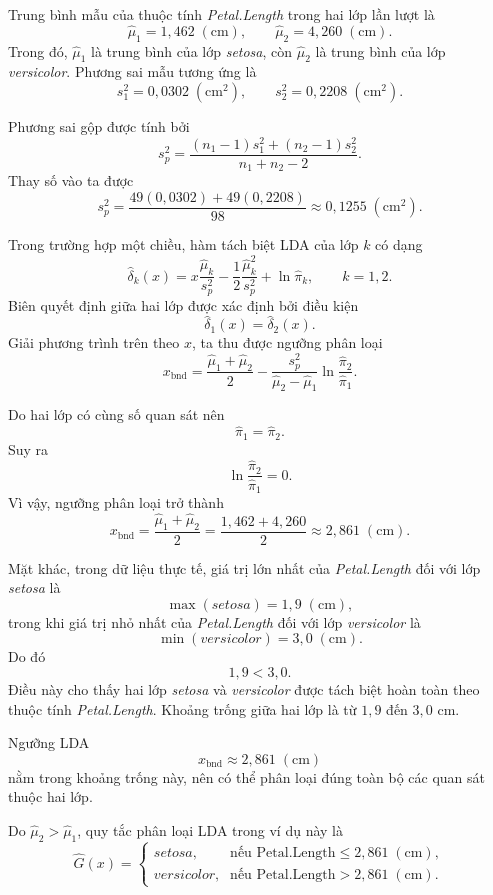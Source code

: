 Trung bình mẫu của thuộc tính \textit{Petal.Length} trong hai lớp lần lượt là
\[
\hat{\mu}_1=1{,}462\;(\text{cm}), 
\qquad 
\hat{\mu}_2=4{,}260\;(\text{cm}).
\]
Trong đó, $\hat{\mu}_1$ là trung bình của lớp \textit{setosa}, còn $\hat{\mu}_2$ là trung bình của lớp \textit{versicolor}. Phương sai mẫu tương ứng là
\[
s_1^2=0{,}0302\;(\text{cm}^2), 
\qquad 
s_2^2=0{,}2208\;(\text{cm}^2).
\]

Phương sai gộp được tính bởi
\[
s_p^2
=
\frac{(n_1-1)s_1^2+(n_2-1)s_2^2}{n_1+n_2-2}.
\]
Thay số vào ta được
\[
s_p^2
=
\frac{49(0{,}0302)+49(0{,}2208)}{98}
\approx
0{,}1255\;(\text{cm}^2).
\]

Trong trường hợp một chiều, hàm tách biệt LDA của lớp $k$ có dạng
\[
\hat{\delta}_k(x)
=
x\frac{\hat{\mu}_k}{s_p^2}
-
\frac{1}{2}\frac{\hat{\mu}_k^2}{s_p^2}
+
\ln\hat{\pi}_k,
\qquad k=1,2.
\]
Biên quyết định giữa hai lớp được xác định bởi điều kiện
\[
\hat{\delta}_1(x)=\hat{\delta}_2(x).
\]
Giải phương trình trên theo $x$, ta thu được ngưỡng phân loại
\[
x_{\text{bnd}}
=
\frac{\hat{\mu}_1+\hat{\mu}_2}{2}
-
\frac{s_p^2}{\hat{\mu}_2-\hat{\mu}_1}
\ln\frac{\hat{\pi}_2}{\hat{\pi}_1}.
\]

Do hai lớp có cùng số quan sát nên
\[
\hat{\pi}_1=\hat{\pi}_2.
\]
Suy ra
\[
\ln\frac{\hat{\pi}_2}{\hat{\pi}_1}=0.
\]
Vì vậy, ngưỡng phân loại trở thành
\[
x_{\text{bnd}}
=
\frac{\hat{\mu}_1+\hat{\mu}_2}{2}
=
\frac{1{,}462+4{,}260}{2}
\approx
2{,}861\;(\text{cm}).
\]

Mặt khác, trong dữ liệu thực tế, giá trị lớn nhất của \textit{Petal.Length} đối với lớp \textit{setosa} là
\[
\max(\textit{setosa})=1{,}9\;(\text{cm}),
\]
trong khi giá trị nhỏ nhất của \textit{Petal.Length} đối với lớp \textit{versicolor} là
\[
\min(\textit{versicolor})=3{,}0\;(\text{cm}).
\]
Do đó
\[
1{,}9 < 3{,}0.
\]
Điều này cho thấy hai lớp \textit{setosa} và \textit{versicolor} được tách biệt hoàn toàn theo thuộc tính \textit{Petal.Length}. Khoảng trống giữa hai lớp là từ $1{,}9$ đến $3{,}0$ cm.

Ngưỡng LDA
\[
x_{\text{bnd}}\approx 2{,}861\;(\text{cm})
\]
nằm trong khoảng trống này, nên có thể phân loại đúng toàn bộ các quan sát thuộc hai lớp.

Do $\hat{\mu}_2>\hat{\mu}_1$, quy tắc phân loại LDA trong ví dụ này là
\[
\hat{G}(x)=
\begin{cases}
	\textit{setosa}, & \text{nếu } \text{Petal.Length}\leq 2{,}861\;(\text{cm}),\\
	\textit{versicolor}, & \text{nếu } \text{Petal.Length}>2{,}861\;(\text{cm}).
\end{cases}
\]

